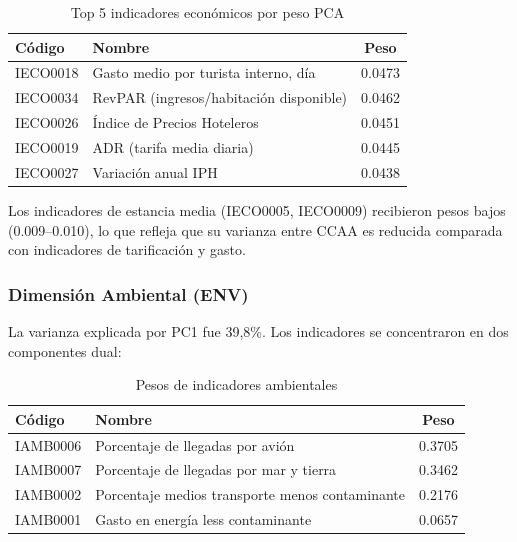 \begin{table}[H]
    \centering
    \small
    \begin{tabular}{llc}
        \toprule
        \textbf{Código} & \textbf{Nombre} & \textbf{Peso} \\
        \midrule
        IECO0018 & Gasto medio por turista interno, día & 0.0473 \\
        IECO0034 & RevPAR (ingresos/habitación disponible) & 0.0462 \\
        IECO0026 & Índice de Precios Hoteleros & 0.0451 \\
        IECO0019 & ADR (tarifa media diaria) & 0.0445 \\
        IECO0027 & Variación anual IPH & 0.0438 \\
        \bottomrule
    \end{tabular}
    \caption{Top 5 indicadores económicos por peso PCA}
    \label{tab:pesos_eco_top5}
\end{table}

Los indicadores de estancia media (IECO0005, IECO0009) recibieron pesos bajos (0.009--0.010), lo que refleja que su varianza entre CCAA es reducida comparada con indicadores de tarificación y gasto.

\subsubsection{Dimensión Ambiental (ENV)}

La varianza explicada por PC1 fue 39,8\%. Los indicadores se concentraron en dos componentes dual:

\begin{table}[H]
    \centering
    \small
    \begin{tabular}{llc}
        \toprule
        \textbf{Código} & \textbf{Nombre} & \textbf{Peso} \\
        \midrule
        IAMB0006 & Porcentaje de llegadas por avión & 0.3705 \\
        IAMB0007 & Porcentaje de llegadas por mar y tierra & 0.3462 \\
        IAMB0002 & Porcentaje medios transporte menos contaminante & 0.2176 \\
        IAMB0001 & Gasto en energía less contaminante & 0.0657 \\
        \bottomrule
    \end{tabular}
    \caption{Pesos de indicadores ambientales}
    \label{tab:pesos_env}
\end{table}


